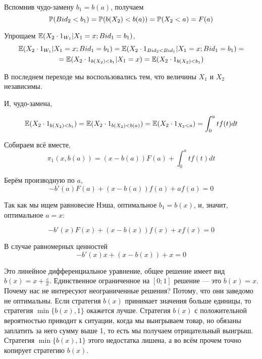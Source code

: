 \begin{myex}
Вспомнив чудо-замену $ b_{1}=b(a) $, получаем
\begin{equation}
\P(Bid_{2}<b_{1})=\P(b(X_{2})<b(a))=\P(X_{2}<a)=F(a)
\end{equation}

Упрощаем $ \E(X_{2}\cdot 1_{W_{1}}|X_{1}=x; Bid_{1}=b_{1}) $,
\begin{multline}
\E(X_{2}\cdot 1_{W_{1}}|X_{1}=x; Bid_{1}=b_{1})=\E(X_{2}\cdot 1_{Bid_{2}<Bid_{1}}|X_{1}=x; Bid_{1}=b_{1})=\\
=\E(X_{2}\cdot 1_{b(X_{2})<b_{1}}|X_{1}=x)=\E(X_{2}\cdot 1_{b(X_{2})<b_{1}})
\end{multline}

В последнем переходе мы воспользовались тем, что величины $ X_{1} $ и $ X_{2} $ независимы.

И, чудо-замена, 

\begin{equation}
\E(X_{2}\cdot 1_{b(X_{2})<b_{1}})=\E(X_{2}\cdot 1_{b(X_{2})<b(a)})=\E(X_{2}\cdot 1_{X_{2}<a})=\int_{0}^{a}tf(t)dt
\end{equation}

Собираем всё вместе,
\begin{equation}
\pi_{1}(x,b(a))=(x-b(a))F(a)+\int_{0}^{a}tf(t)dt
\end{equation}

Берём производную по $ a $,
\begin{equation}
-b'(a)F(a)+(x-b(a))f(a)+af(a)=0
\end{equation}

Так как мы ищем равновесие Нэша, оптимальное $b_{1}=b(x)$, и, значит, оптимальное $ a=x $:

\begin{equation}
-b'(x)F(x)+(x-b(x))f(x)+xf(x)=0
\end{equation}

В случае равномерных ценностей
\begin{equation}
-b'(x)x+(x-b(x))+x=0
\end{equation}

Это линейное дифференциальное уравнение, общее решение имеет вид $ b(x)=x+\frac{c}{x} $. Единственное ограниченное на $ [0;1] $ решение — это $ b(x)=x $. Почему нас не интересуют неограниченные решения? Потому, что они заведомо не оптимальны. Если стратегия $ b(x) $ принимает значения больше единицы, то стратегия $ \min\{b(x),1\} $ окажется лучше. Стратегия $b(x)$ с положительной вероятностью приводит к ситуации, когда мы выигрываем товар, но обязаны заплатить за него сумму выше 1, то есть мы получаем отрицательный выигрыш. Стратегия $\min\{b(x), 1\}$ этого недостатка лишена, а во всём прочем точно копирует стратегию $b(x)$.

\end{myex}


